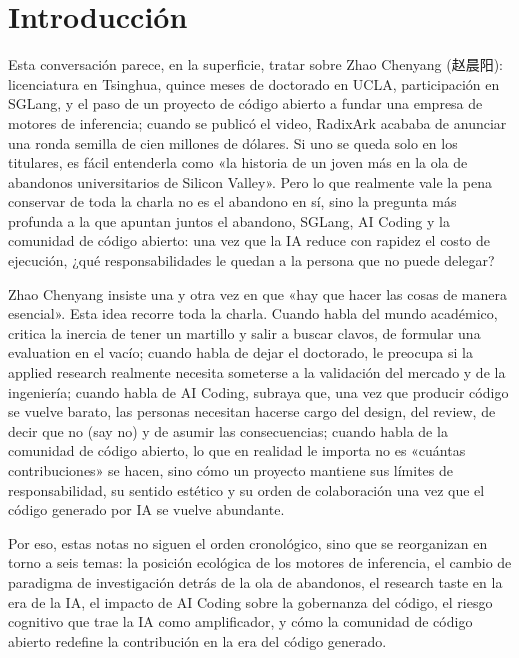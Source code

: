 \section*{Introducción}

Esta conversación parece, en la superficie, tratar sobre Zhao Chenyang (赵晨阳): licenciatura en Tsinghua, quince meses de doctorado en UCLA, participación en SGLang, y el paso de un proyecto de código abierto a fundar una empresa de motores de inferencia; cuando se publicó el video, RadixArk acababa de anunciar una ronda semilla de cien millones de dólares. Si uno se queda solo en los titulares, es fácil entenderla como «la historia de un joven más en la ola de abandonos universitarios de Silicon Valley». Pero lo que realmente vale la pena conservar de toda la charla no es el abandono en sí, sino la pregunta más profunda a la que apuntan juntos el abandono, SGLang, AI Coding y la comunidad de código abierto: una vez que la IA reduce con rapidez el costo de ejecución, ¿qué responsabilidades le quedan a la persona que no puede delegar?

Zhao Chenyang insiste una y otra vez en que «hay que hacer las cosas de manera esencial». Esta idea recorre toda la charla. Cuando habla del mundo académico, critica la inercia de tener un martillo y salir a buscar clavos, de formular una evaluation en el vacío; cuando habla de dejar el doctorado, le preocupa si la applied research realmente necesita someterse a la validación del mercado y de la ingeniería; cuando habla de AI Coding, subraya que, una vez que producir código se vuelve barato, las personas necesitan hacerse cargo del design, del review, de decir que no (say no) y de asumir las consecuencias; cuando habla de la comunidad de código abierto, lo que en realidad le importa no es «cuántas contribuciones» se hacen, sino cómo un proyecto mantiene sus límites de responsabilidad, su sentido estético y su orden de colaboración una vez que el código generado por IA se vuelve abundante.

Por eso, estas notas no siguen el orden cronológico, sino que se reorganizan en torno a seis temas: la posición ecológica de los motores de inferencia, el cambio de paradigma de investigación detrás de la ola de abandonos, el research taste en la era de la IA, el impacto de AI Coding sobre la gobernanza del código, el riesgo cognitivo que trae la IA como amplificador, y cómo la comunidad de código abierto redefine la contribución en la era del código generado.

